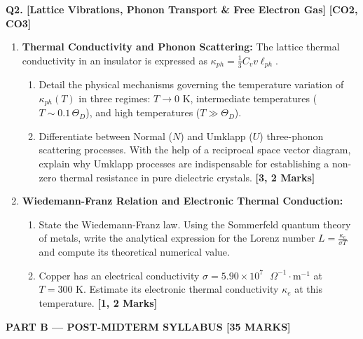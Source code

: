 \documentclass[11pt,a4paper]{article}
\begin{document}
\vspace{4pt}
\noindent\textbf{Q2. [Lattice Vibrations, Phonon Transport \& Free Electron Gas]} \hfill \textbf{[CO2, CO3]}
\begin{enumerate}[label=(\alph*),leftmargin=1.8em,itemsep=3pt]
    \item \textbf{Thermal Conductivity and Phonon Scattering:}
    The lattice thermal conductivity in an insulator is expressed as $\kappa_{ph} = \frac{1}{3} C_v v \ell_{ph}$.
    \begin{enumerate}[label=(\roman*),itemsep=1.5pt]
        \item Detail the physical mechanisms governing the temperature variation of $\kappa_{ph}(T)$ in three regimes: $T \to 0\text{ K}$, intermediate temperatures ($T \sim 0.1\,\Theta_D$), and high temperatures ($T \gg \Theta_D$).
        \item Differentiate between Normal ($N$) and Umklapp ($U$) three-phonon scattering processes. With the help of a reciprocal space vector diagram, explain why Umklapp processes are indispensable for establishing a non-zero thermal resistance in pure dielectric crystals. \hfill\textbf{[3, 2 Marks]}
    \end{enumerate}

    \item \textbf{Wiedemann-Franz Relation and Electronic Thermal Conduction:}
    \begin{enumerate}[label=(\roman*),itemsep=1.5pt]
        \item State the Wiedemann-Franz law. Using the Sommerfeld quantum theory of metals, write the analytical expression for the Lorenz number $L = \frac{\kappa_e}{\sigma T}$ and compute its theoretical numerical value.
        \item Copper has an electrical conductivity $\sigma = 5.90 \times 10^7\text{ }\Omega^{-1}\cdot\text{m}^{-1}$ at $T = 300\text{ K}$. Estimate its electronic thermal conductivity $\kappa_e$ at this temperature. \hfill\textbf{[1, 2 Marks]}
    \end{enumerate}
\end{enumerate}

\vspace{6pt}
\begin{center}
    {\large\bfseries PART B --- POST-MIDTERM SYLLABUS [35 MARKS]}
\end{center}
\vspace{-4pt}
\end{document}
